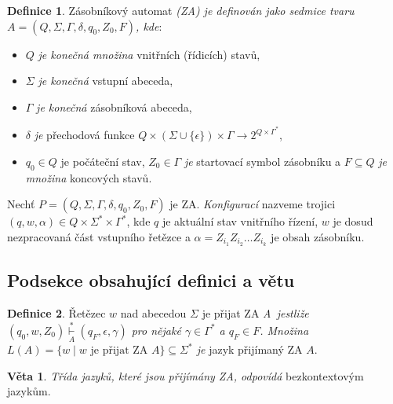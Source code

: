 \documentclass[hidelinks, twocolumn, a4paper, 11pt]{article}
\theoremstyle{definition}
\newtheorem{theorem_def}{Definice}
\newtheorem{theorem_veta}{Věta}
\begin{document}
\begin{theorem_def}
    \label{def:1}
    Zásobníkový automat \emph{(ZA) je definován jako sedmice tvaru $A = (Q,\Sigma,\Gamma,\delta, q_0, Z_0, F)$, kde}:     

    \begin{itemize}
        \item $Q$ \emph{je konečná množina} vnitřních (řídicích) stavů, 
        \item $\Sigma$ \emph{je konečná} vstupní abeceda, 
        \item $\Gamma$ \emph{je konečná} zásobníková abeceda, 
        \item $\delta$ \emph{je} přechodová funkce $Q \times (\Sigma \cup \{\epsilon\}) \times \Gamma \rightarrow 2^{Q\times\Gamma^\ast}$,
        \item $q_0 \in Q$ je počáteční stav, $Z_0 \in \Gamma$ \emph{je} startovací symbol zásobníku a $F \subseteq Q$ \emph{je množina} koncových stavů. 
    \end{itemize}
\end{theorem_def}


Nechť $P = (Q,\Sigma,\Gamma,\delta, q_0, Z_0, F)$ je ZA. 
\emph{Konfigurací} nazveme trojici $(q,w,\alpha) \in Q \times \Sigma^\ast \times \Gamma^\ast$, 
kde $q$ je aktuální stav vnitřního řízení, 
$w$ je dosud nezpracovaná část vstupního řetězce a
$\alpha = Z_{i_1}Z_{i_2}\dots Z_{i_k}$ je obsah zásobníku.

\subsection{Podsekce obsahující definici a větu}

\begin{theorem_def}
    Řetězec $w$ nad abecedou $\Sigma$ je přijat ZA \emph{A~jestliže $(q_0, w, Z_0) \underset{A}{\overset{*}{\vdash}} (q_F,\epsilon,\gamma)$ 
    pro nějaké $\gamma \in \Gamma^\ast$ a $q_F \in F$. 
    Množina $L(A) = \{ w \mid w \mbox{ je přijat ZA } A \} \subseteq \Sigma^\ast$ je} jazyk přijímaný ZA $A$.
\end{theorem_def}

\begin{theorem_veta}
    \emph{Třída jazyků, které jsou přijímány ZA, odpovídá} bezkontextovým jazykům.
\end{theorem_veta}
\end{document}
